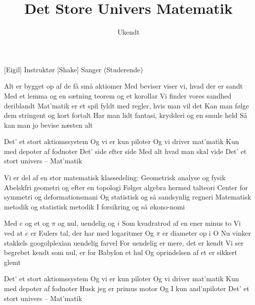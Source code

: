 \documentclass[a4paper,11pt]{article}
\title{Det Store Univers Matematik}
\author{Ukendt}
\begin{document}
\maketitle

\begin{roles}
[Eigil] Instruktør
[Shake] Sanger (Studerende)
\end{roles}

\begin{song}
 Alt er bygget op af de få små aktiomer
Med beviser viser vi, hvad der er sandt
Med et lemma og en sætning teorem og et korollar
Vi finder vores sandhed deriblandt
Mat'matik er et spil fyldt med regler, hvis man vil det
Kan man følge dem stringent og kort fortalt
Har man lidt fantasi, krydderi og en smule held
Så kan man jo bevise næsten alt

 Det' et stort aktiomssystem
Og vi er kun piloter
Og vi driver mat'matik
Kun med depoter af fodnoter
Det' side efter side
Med alt hvad man skal vide
Det' et stort univers -- Mat'matik

 Vi er del af en stor matematisk klassedeling:
Geometrisk analyse og fysik
Abelskfri geometri og efter en topologi
Følger algebra hermed talteori
Center for symmetri og deformationsmani
Og statistisk og så sandsynlig regneri
Matematisk metodik og statistisk metodik
I forsikring og så økono-nomi

 Med $e$ og et og $\pi$ og nul, uendelig og $i$
Som kvadratrod af en ener minus to
Vi ved at $e$ er Eulers tal, der har med logaritmer
Og $\pi$ er diameter op i O
Nu vinker stakkels googolplexian uendelig farvel
For uendelig er mere, det er kendt
Vi ser begrebet kendt som nul, er for Babylon et hul
Og oprindelsen af et er sikkert glemt

 Det' et stort aktiomssystem
Og vi er kun piloter
Og vi driver mat'matik
Kun med depoter af fodnoter
Husk jeg er primus motor
Og I kun and'npiloter
Det' et stort univers -- Mat'matik
\end{song}
\end{document}
